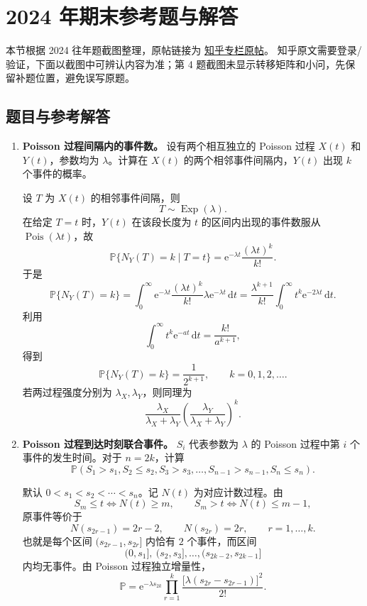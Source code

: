\documentclass[12pt,a4paper,openany]{ctexrep}
\theoremstyle{definition}
\newcommand{\Pp}{\mathbb{P}}
\newcommand{\Pois}{\operatorname{Pois}}
\newcommand{\Exp}{\operatorname{Exp}}
\newcommand{\dd}{\,\mathrm{d}}
\newcommand{\e}{\mathrm{e}}
\begin{document}
\chapter{2024 年期末参考题与解答}

本节根据 2024 往年题截图整理，原帖链接为
\href{https://zhuanlan.zhihu.com/p/2010142988702078198}{知乎专栏原帖}。
知乎原文需要登录/验证，下面以截图中可辨认内容为准；第 4 题截图未显示转移矩阵和小问，先保留补题位置，避免误写原题。

\section{题目与参考解答}

\begin{enumerate}[label=\textbf{题 \arabic*:}]
	\item \textbf{Poisson 过程间隔内的事件数。}
	设有两个相互独立的 Poisson 过程 $X(t)$ 和 $Y(t)$，参数均为 $\lambda$。计算在 $X(t)$ 的两个相邻事件间隔内，$Y(t)$ 出现 $k$ 个事件的概率。

	设 $T$ 为 $X(t)$ 的相邻事件间隔，则
	\[
	T\sim \Exp(\lambda).
	\]
	在给定 $T=t$ 时，$Y(t)$ 在该段长度为 $t$ 的区间内出现的事件数服从 $\Pois(\lambda t)$，故
	\[
	\Pp\{N_Y(T)=k\mid T=t\}
	=\e^{-\lambda t}\frac{(\lambda t)^k}{k!}.
	\]
	于是
	\[
	\Pp\{N_Y(T)=k\}
	=\int_0^\infty \e^{-\lambda t}\frac{(\lambda t)^k}{k!}\lambda\e^{-\lambda t}\dd t
	=\frac{\lambda^{k+1}}{k!}\int_0^\infty t^k\e^{-2\lambda t}\dd t.
	\]
	利用
	\[
	\int_0^\infty t^k\e^{-at}\dd t=\frac{k!}{a^{k+1}},
	\]
	得到
	\[
	\boxed{\Pp\{N_Y(T)=k\}=\frac1{2^{k+1}},\qquad k=0,1,2,\ldots.}
	\]
	若两过程强度分别为 $\lambda_X,\lambda_Y$，则同理为
	\[
	\frac{\lambda_X}{\lambda_X+\lambda_Y}
	\left(\frac{\lambda_Y}{\lambda_X+\lambda_Y}\right)^k.
	\]

	\item \textbf{Poisson 过程到达时刻联合事件。}
	$S_i$ 代表参数为 $\lambda$ 的 Poisson 过程中第 $i$ 个事件的发生时间。对于 $n=2k$，计算
	\[
	\Pp(S_1>s_1,S_2\le s_2,S_3>s_3,\ldots,S_{n-1}>s_{n-1},S_n\le s_n).
	\]

	默认 $0<s_1<s_2<\cdots<s_n$。记 $N(t)$ 为对应计数过程。由
	\[
	S_m\le t\iff N(t)\ge m,\qquad
	S_m>t\iff N(t)\le m-1,
	\]
	原事件等价于
	\[
	N(s_{2r-1})=2r-2,\qquad N(s_{2r})=2r,\qquad r=1,\ldots,k.
	\]
	也就是每个区间 $(s_{2r-1},s_{2r}]$ 内恰有 $2$ 个事件，而区间
	\[
	(0,s_1],\ (s_2,s_3],\ldots,(s_{2k-2},s_{2k-1}]
	\]
	内均无事件。由 Poisson 过程独立增量性，
	\[
	\boxed{
	\Pp
	=
	\e^{-\lambda s_{2k}}
	\prod_{r=1}^{k}
	\frac{\bigl[\lambda(s_{2r}-s_{2r-1})\bigr]^2}{2!}
	}.
	\]


\end{enumerate}
\end{document}
